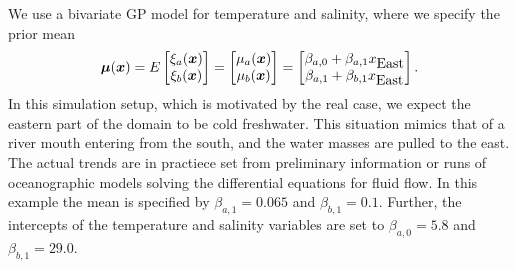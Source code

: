 \documentclass[aoas]{imsart}
\begin{document}
We use a bivariate GP model for temperature and salinity, where we specify the prior mean 
\begin{equation}\label{m}
    \bmu(\bx)=E 
    \begin{bmatrix}
    \xi_a(\bx) \\
    \xi_b(\bx) 
    \end{bmatrix}=\begin{bmatrix} \mu_{a}(\bx)\\
\mu_{b}(\bx)
\end{bmatrix} 
= \begin{bmatrix} \beta_{a,0} + \beta_{a,1} x_{\mbox{East}} \\
\beta_{a,1} + \beta_{b,1} x_{\mbox{East}}
\end{bmatrix}.
\end{equation}
In this simulation setup, which is motivated by the real case, we expect the eastern part of the domain to be cold freshwater. This situation mimics that of a river mouth entering from the south, and the water masses are pulled to the east. The actual trends are in practiece set from preliminary information or runs of oceanographic models solving the differential equations for fluid flow. In this example the mean is specified by $\beta_{a,1}=0.065$ and $\beta_{b,1}=0.1$. Further, the intercepts of the temperature and salinity variables are set to $\beta_{a,0}=5.8$ and $\beta_{b,1}=29.0$. 

\end{document}
